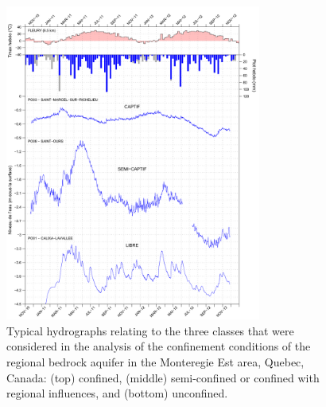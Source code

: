 \documentclass[WHATMANUAL.tex]{subfiles}
\begin{document}
\begin{figure}[!hb]
\centering
\includegraphics[width=0.75\textwidth]{img/CasTypes.png}
\caption[Typical hydrographs relating to the three classes that were considered in the analysis of the confinement conditions of the regional bedrock aquifer in the Monteregie Est area, Quebec, Canada.]{Typical hydrographs relating to the three classes that were considered in the analysis of the confinement conditions of the regional bedrock aquifer in the Monteregie Est area, Quebec, Canada: (top) confined, (middle) semi-confined or confined with regional influences, and (bottom) unconfined.}
\label{fig:casTypes_hydrographs}
\end{figure}
\end{document}
